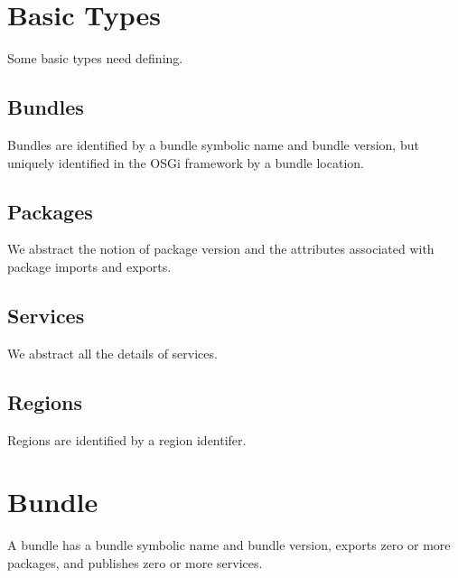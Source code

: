 \documentclass[a4paper,9pt]{article}
\begin{document}
\clearpage
\section{Basic Types}
\label{cha:basics}

Some basic types need defining.

\subsection*{Bundles}

Bundles are identified by a bundle symbolic name and bundle version, but uniquely identified in the
OSGi framework by a bundle location.
\begin{zed}
\end{zed}

\subsection*{Packages}

We abstract the notion of package version and the attributes associated with package imports and exports.
\begin{zed}
  [Package]
\end{zed}

\subsection*{Services}

We abstract all the details of services.
\begin{zed}
  [Service]
\end{zed}

\subsection*{Regions}

Regions are identified by a region identifer.
\begin{zed}
  [RId]
\end{zed}

\clearpage
\section{Bundle}
\label{cha:bundle}

A bundle has a bundle symbolic name and bundle version, exports zero or more packages, and
publishes zero or more services.
\end{document}
